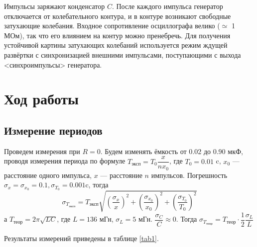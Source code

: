 \documentclass[a4paper,14pt]{article}
\begin{document}
Импульсы заряжают конденсатор $C$. После каждого импульса генератор отключается от колебательного контура, и в контуре возникают свободные затухающие колебания. Входное сопротивление осциллографа велико ($\simeq$ 1 МОм), так что
его влиянием на контур можно пренебречь. Для получения устойчивой картины
затухающих колебаний используется режим ждущей развёртки с синхронизацией
внешними импульсами, поступающими с выхода <синхроимпульсы> генератора.

\section*{Ход работы}

\subsection*{Измерение периодов}

Проведем измерения при $ R = 0 $. Будем изменять ёмкость от 0.02 до 0.90 мкФ, проводя измерения периода по формуле $T_{\text{эксп}} = T_0 \dfrac{x}{nx_0}$,
где $ T_0 = 0.01 $ c, $ x_0 $ --- расстояние одного импульса, $ x $ --- расстояние $ n $ импульсов. Погрешность $ \sigma_x = \sigma_{x_0} = 0.1, \sigma_{T_0} = 0.001  $c, тогда 
$$\sigma_{T_{\text{эксп}}} = T_{\text{эксп}} \sqrt{ \left( \dfrac{ \sigma_x}{x} \right)^2 + \left( \dfrac{ \sigma_{x_0}}{x_0} \right)^2  +  \left( \dfrac{ \sigma_{T_0}}{T_0} \right)^2}$$
а $ T_{\text{теор}} = 2\pi\sqrt{LC} $, где $ L = 136 $ мГн, $ \sigma_L = 5 $ мГн. $ \dfrac{\sigma_C}{C} \approx 0 $. Тогда $\sigma_{T_{\text{теор}}} = T_{\text{теор}} \cdot \dfrac{1}{2} \dfrac{\sigma_L}{L}$

Результаты измерений приведены в таблице \ref{tab1}.
\end{document}

